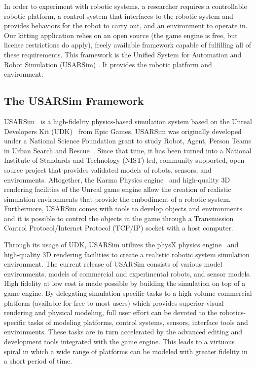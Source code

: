 \label{sect:simulation}
In order to experiment with robotic systems, a researcher requires a controllable robotic platform, a control system that interfaces to the robotic system and provides behaviors for the robot to carry out, and an environment to operate in. Our kitting application relies on an open source (the game engine is free, but license restrictions do apply), freely available framework capable of fulfilling all of these requirements. This framework is the Unified System for Automation and Robot Simulation (USARSim) \cite{USARSimWeb}. It provides the robotic platform and environment.

\subsection{The USARSim Framework}

USARSim~\cite{CARPIN.LNAI.2006,WANG.WSC.2003} is a high-fidelity physics-based simulation system based on the Unreal Developers Kit (UDK)~\cite{UDKWeb} from Epic Games. USARSim was originally developed under a National Science Foundation grant to study Robot, Agent, Person Teams in Urban Search and Rescue~\cite{LEWIS.ICHC.2003}. Since that time, it has been turned into a National Institute of Standards and Technology (NIST)-led, community-supported, open source project that provides validated models of robots, sensors, and environments. Altogether, the Karma Physics engine~\cite{KarmEngine} and high-quality 3D rendering facilities of the Unreal game engine allow the creation of realistic simulation environments that provide the embodiment of a robotic system. Furthermore, USARSim comes with tools to develop objects and environments and it is possible to control the objects in the game through a Transmission Control Protocol/Internet Protocol (TCP/IP) socket with a host computer.

Through its usage of UDK, USARSim utilizes the physX physics engine~\cite{physXWeb} and high-quality 3D rendering facilities to create a realistic robotic system simulation environment. The current release of USARSim consists of various model environments, models of commercial and experimental robots, and sensor models. High fidelity at low cost is made possible by building the simulation on top of a game engine. By delegating  simulation specific tasks to a high volume commercial platform (available for free to most users) which provides superior visual rendering and physical modeling, full user effort can be devoted to the robotics-specific tasks of modeling platforms, control systems, sensors, interface tools and environments. These tasks are in turn accelerated by the advanced editing and development tools integrated with the game engine. This leads to a virtuous spiral in which a wide range of platforms can be modeled with greater fidelity in a short period of time.

